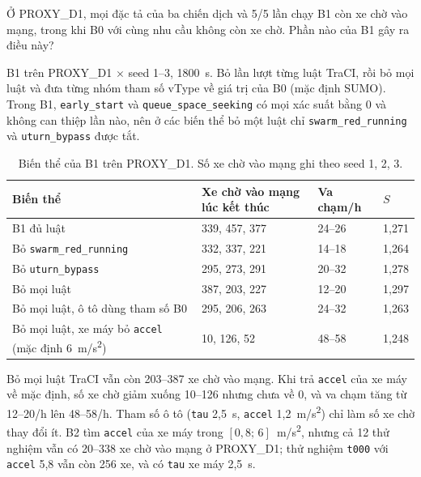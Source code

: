 \documentclass[../main.tex]{subfiles}
\begin{document}
Ở PROXY\_D1, mọi đặc tả của ba chiến dịch và 5/5 lần chạy B1 còn xe chờ vào mạng, trong khi B0 với cùng nhu cầu không còn xe chờ. Phần nào của B1 gây ra điều này?

B1 trên PROXY\_D1 $\times$ seed 1--3, 1800~s. Bỏ lần lượt từng luật TraCI, rồi bỏ mọi luật và đưa từng nhóm tham số vType về giá trị của B0 (mặc định SUMO). Trong B1, \texttt{early\_start} và \texttt{queue\_space\_seeking} có mọi xác suất bằng 0 và không can thiệp lần nào, nên ở các biến thể bỏ một luật chỉ \texttt{swarm\_red\_running} và \texttt{uturn\_bypass} được tắt.

\begin{table}[!htbp]
\centering
\small
\caption{Biến thể của B1 trên PROXY\_D1. Số xe chờ vào mạng ghi theo seed 1, 2, 3.} \label{table:4.d1_backlog}
\begin{tabular}{|>{\raggedright\arraybackslash}p{6.4cm}|p{3.0cm}|p{1.8cm}|p{1.4cm}|}
\hline
\textbf{Biến thể} & \textbf{Xe chờ vào mạng lúc kết thúc} & \textbf{Va chạm/h} & \textbf{$S$} \\ \hline
B1 đủ luật & 339, 457, 377 & 24--26 & 1,271 \\ \hline
Bỏ \texttt{swarm\_red\_running} & 332, 337, 221 & 14--18 & 1,264 \\ \hline
Bỏ \texttt{uturn\_bypass} & 295, 273, 291 & 20--32 & 1,278 \\ \hline
Bỏ mọi luật & 387, 203, 227 & 12--20 & 1,297 \\ \hline
Bỏ mọi luật, ô tô dùng tham số B0 & 295, 206, 263 & 24--32 & 1,263 \\ \hline
Bỏ mọi luật, xe máy bỏ \texttt{accel} (mặc định 6~m/s\textsuperscript{2}) & 10, 126, 52 & 48--58 & 1,248 \\ \hline
\end{tabular}
\end{table}

Bỏ mọi luật TraCI vẫn còn 203--387 xe chờ vào mạng. Khi trả \texttt{accel} của xe máy về mặc định, số xe chờ giảm xuống 10--126 nhưng chưa về 0, và va chạm tăng từ 12--20/h lên 48--58/h. Tham số ô tô (\texttt{tau} 2,5~s, \texttt{accel} 1,2~m/s\textsuperscript{2}) chỉ làm số xe chờ thay đổi ít. B2 tìm \texttt{accel} của xe máy trong $[0{,}8;\,6]$~m/s\textsuperscript{2}, nhưng cả 12 thử nghiệm vẫn có 20--338 xe chờ vào mạng ở PROXY\_D1; thử nghiệm \texttt{t000} với \texttt{accel} 5,8 vẫn còn 256 xe, và có \texttt{tau} xe máy 2,5~s.
\end{document}

